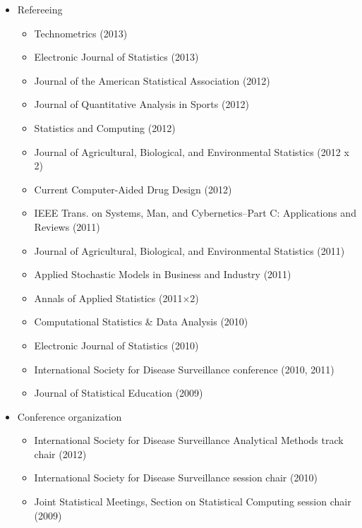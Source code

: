 \documentclass[overlapped,line,letterpaper]{res}
\begin{document}
\begin{resume}
\begin{itemize}
\item Refereeing
 \begin{itemize}
 \item Technometrics (2013)
 \item Electronic Journal of Statistics (2013)
 \item Journal of the American Statistical Association (2012)
 \item Journal of Quantitative Analysis in Sports (2012)
 \item Statistics and Computing (2012)
 \item Journal of Agricultural, Biological, and Environmental Statistics (2012 x 2)
 \item Current Computer-Aided Drug Design (2012)
 \item IEEE Trans. on Systems, Man, and Cybernetics--Part C: Applications and Reviews (2011)
 \item Journal of Agricultural, Biological, and Environmental Statistics (2011)
 \item Applied Stochastic Models in Business and Industry (2011)
 \item Annals of Applied Statistics  (2011$\times 2$)
 \item Computational Statistics \& Data Analysis (2010)
 \item Electronic Journal of Statistics (2010)
 \item International Society for Disease Surveillance conference (2010, 2011)
 \item Journal of Statistical Education (2009)
 \end{itemize}
\item Conference organization
 \begin{itemize}
 \item International Society for Disease Surveillance Analytical Methods track chair (2012)
 \item International Society for Disease Surveillance session chair (2010)
 \item Joint Statistical Meetings, Section on Statistical Computing session chair (2009)
 \end{itemize}



\end{itemize}
\end{resume}
\end{document}
